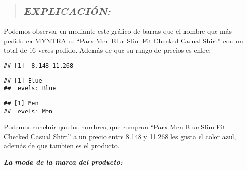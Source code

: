 \documentclass[
]{article}
\newenvironment{Shaded}{\begin{snugshade}}{\end{snugshade}}
\newcommand{\FunctionTok}[1]{\textcolor[rgb]{0.00,0.00,0.00}{#1}}
\newcommand{\NormalTok}[1]{#1}
\newcommand{\SpecialCharTok}[1]{\textcolor[rgb]{0.00,0.00,0.00}{#1}}
\begin{document}
\begin{quote}
\hypertarget{explicaciuxf3n}{%
\subsection{\texorpdfstring{\textbf{\emph{EXPLICACIÓN:}}}{EXPLICACIÓN:}}\label{explicaciuxf3n}}
\end{quote}

Podemos observar en mediante este gráfico de barras que el nombre que
más pedido en MYNTRA es ``Parx Men Blue Slim Fit Checked Casual Shirt''
con un total de 16 veces pedido. Además de que su rango de precios es
entre:

\begin{Shaded}
\end{Shaded}

\begin{verbatim}
## [1]  8.148 11.268
\end{verbatim}

\begin{Shaded}
\end{Shaded}

\begin{verbatim}
## [1] Blue
## Levels: Blue
\end{verbatim}

\begin{Shaded}
\end{Shaded}

\begin{verbatim}
## [1] Men
## Levels: Men
\end{verbatim}

Podemos concluir que los hombres, que compran ``Parx Men Blue Slim Fit
Checked Casual Shirt'' a un precio entre 8.148 y 11.268 les gusta el
color azul, además de que tambien es el producto.

\textbf{\emph{La moda de la marca del producto:}}
\end{document}
